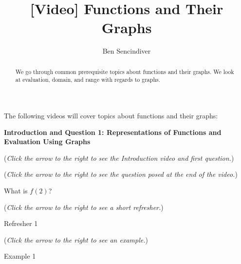 \documentclass{ximera}
\title[Prerequisite Videos: ]{[Video] Functions and Their Graphs}
\author{Ben Sencindiver}
\begin{document}
\begin{abstract}
  We go through common prerequisite topics about functions and their graphs. 
  We look at evaluation, domain, and range with regards to graphs.
\end{abstract}
\maketitle

The following videos will cover topics about functions and their graphs:

\textbf{Introduction and Question 1: Representations of Functions and Evaluation Using Graphs}
\begin{question}
\begin{flushright}
{\color{blue}(\emph{Click the arrow to the right to see the Introduction video and first question.})}
\end{flushright}
\begin{center}
\begin{expandable}
\begin{flushright}
{\color{blue}(\emph{Click the arrow to the right to see the  question
posed at the end of the video.})}
\end{flushright}
\begin{expandable}
What is $f(2)$?
\begin{multipleChoice}
\end{multipleChoice}
\begin{flushright}
{\color{blue}(\emph{Click the arrow to the right to see a short refresher.})}
\end{flushright}
\begin{expandable}
\begin{center}
Refresher 1
\end{center}
\end{expandable}
\begin{flushright}
{\color{blue}(\emph{Click the arrow to the right to see an example.})}
\end{flushright}
\begin{expandable}
\begin{center}
Example 1
\end{center}
\end{expandable}
\end{expandable}
\end{expandable}
\end{center}
\end{question}
\end{document}
